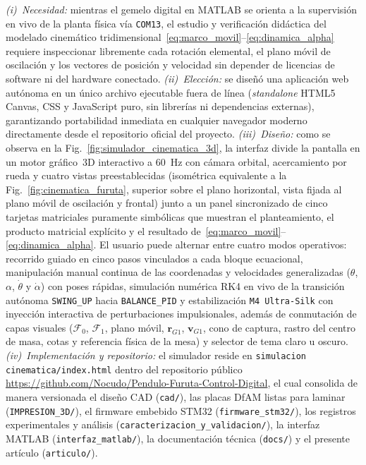 \textit{(i)~Necesidad:} mientras el gemelo digital en MATLAB se orienta a la supervisión en vivo de la planta física vía \texttt{COM13}, el estudio y verificación didáctica del modelado cinemático tridimensional~\eqref{eq:marco_movil}--\eqref{eq:dinamica_alpha} requiere inspeccionar libremente cada rotación elemental, el plano móvil de oscilación y los vectores de posición y velocidad sin depender de licencias de software ni del hardware conectado.
\textit{(ii)~Elección:} se diseñó una aplicación web autónoma en un único archivo ejecutable fuera de línea (\textit{standalone} HTML5 Canvas, CSS y JavaScript puro, sin librerías ni dependencias externas), garantizando portabilidad inmediata en cualquier navegador moderno directamente desde el repositorio oficial del proyecto.
\textit{(iii)~Diseño:} como se observa en la Fig.~\ref{fig:simulador_cinematica_3d}, la interfaz divide la pantalla en un motor gráfico~3D interactivo a \qty{60}{\hertz} con cámara orbital, acercamiento por rueda y cuatro vistas preestablecidas (isométrica equivalente a la Fig.~\ref{fig:cinematica_furuta}, superior sobre el plano horizontal, vista fijada al plano móvil de oscilación y frontal) junto a un panel sincronizado de cinco tarjetas matriciales puramente simbólicas que muestran el planteamiento, el producto matricial explícito y el resultado de~\eqref{eq:marco_movil}--\eqref{eq:dinamica_alpha}. El usuario puede alternar entre cuatro modos operativos: recorrido guiado en cinco pasos vinculados a cada bloque ecuacional, manipulación manual continua de las coordenadas y velocidades generalizadas ($\theta$, $\alpha$, $\dot{\theta}$ y $\dot{\alpha}$) con poses rápidas, simulación numérica RK4 en vivo de la transición autónoma \texttt{SWING\_UP} hacia \texttt{BALANCE\_PID} y estabilización \texttt{M4 Ultra-Silk} con inyección interactiva de perturbaciones impulsionales, además de conmutación de capas visuales ($\mathcal{F}_0$, $\mathcal{F}_1$, plano móvil, $\mathbf{r}_{G1}$, $\mathbf{v}_{G1}$, cono de captura, rastro del centro de masa, cotas y referencia física de la mesa) y selector de tema claro u oscuro.
\textit{(iv)~Implementación y repositorio:} el simulador reside en \texttt{simulacion cinematica/\allowbreak index.html} dentro del repositorio público \url{https://github.com/Nocudo/Pendulo-Furuta-Control-Digital}, el cual consolida de manera versionada el diseño CAD (\texttt{cad/}), las placas DfAM listas para laminar (\texttt{IMPRESION\_3D/}), el firmware embebido STM32 (\texttt{firmware\_stm32/}), los registros experimentales y análisis (\texttt{caracterizacion\_\allowbreak y\_\allowbreak validacion/}), la interfaz MATLAB (\texttt{interfaz\_matlab/}), la documentación técnica (\texttt{docs/}) y el presente artículo (\texttt{articulo/}).
